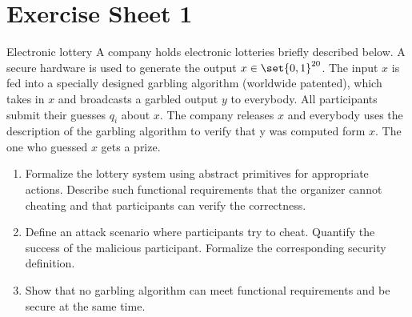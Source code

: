 \documentclass{crypto-exercise}
\begin{document}
\sloppy

\section{Exercise Sheet 1}

\begin{exercise}{Electronic lottery}
  A company holds electronic lotteries briefly described below. A
  secure hardware is used to generate the output $x\in \set{0,
    1}^{20}$.  The input $x$ is fed into a specially designed garbling
  algorithm (worldwide patented), which takes in $x$ and broadcasts a
  garbled output $y$ to everybody. All participants submit their
  guesses $q_i$ about $x$. The company releases $x$ and everybody uses
  the description of the garbling algorithm to verify that y was
  computed form $x$. The one who guessed $x$ gets a prize.
\begin{enumerate}
\item Formalize the lottery system using abstract primitives for appropriate
actions. Describe such functional requirements that the organizer
cannot cheating and that participants can verify the correctness.
\item Define an attack scenario where participants try to cheat. Quantify
the success of the malicious participant. Formalize the corresponding
security definition.
\item Show that no garbling algorithm can meet functional requirements
and be secure at the same time.
\end{enumerate}
\end{exercise}
\end{document}

